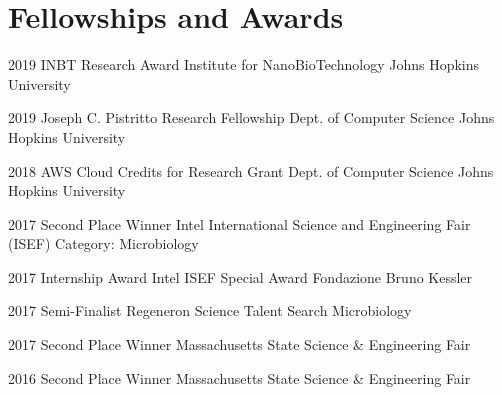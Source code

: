 \section{Fellowships and Awards}

\cventry
{2019}
{INBT Research Award}
{Institute for NanoBioTechnology}
{Johns Hopkins University}
{}
{}%

\cventry
{2019}
{Joseph C. Pistritto Research Fellowship}
{Dept. of Computer Science}
{Johns Hopkins University}
{}
{}%

\cventry
{2018}
{AWS Cloud Credits for Research Grant}
{Dept. of Computer Science}
{Johns Hopkins University}
{}
{} %

\cventry
{2017}
{Second Place Winner}
{Intel International Science and Engineering Fair (ISEF)}
{Category: Microbiology}
{}
{} %

\cventry
{2017}
{Internship Award}
{Intel ISEF Special Award}
{Fondazione Bruno Kessler}
{}
{} %

\cventry
{2017}
{Semi-Finalist}
{Regeneron Science Talent Search}
{Microbiology}
{}
{} %

\cventry
{2017}
{Second Place Winner}
{Massachusetts State Science \& Engineering Fair}
{}
{}
{} %

\cventry
{2016}
{Second Place Winner}
{Massachusetts State Science \& Engineering Fair}
{}
{}
{} %